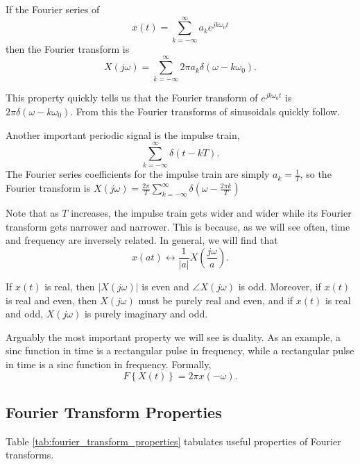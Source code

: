 If the Fourier series of
\begin{equation}
    x(t) = \sum_{k=-\infty}^{\infty} a_k e^{jk\omega_0 t}
\end{equation}
then the Fourier transform is
\begin{equation}
    X(j\omega) = \sum_{k=-\infty}^{\infty} 2\pi a_k \delta(\omega - k\omega_0).
\end{equation}

This property quickly tells us that the Fourier transform
of $e^{jk\omega_0 t}$ is $2\pi \delta(\omega-k\omega_0)$.
From this the Fourier transforms of sinusoidals quickly follow.

Another important periodic signal is the impulse train,
\begin{equation}
    \sum_{k=-\infty}^{\infty} \delta(t - kT).
\end{equation}
The Fourier series coefficients for
the impulse train are simply $a_k = \frac{1}{T}$,
so the Fourier transform is
$X(j\omega) = \frac{2\pi}{T} \sum_{k=-\infty}^{\infty} \delta(\omega - \frac{2\pi k}{T})$

Note that as $T$ increases, the impulse train gets wider
and wider while its Fourier transform gets narrower and
narrower. This is because, as we will see often, time and
frequency are inversely related. In general, we will find
that
\begin{equation}
    x(at) \leftrightarrow \frac{1}{|a|}X(\frac{j\omega}{a}).
\end{equation}

If $x(t)$ is real, then $|X(j\omega)|$ is even and
$\angle X(j\omega)$ is odd. Moreover, if $x(t)$ is real
and even, then $X(j\omega)$ must be purely real and even,
and if $x(t)$ is real and odd, $X(j\omega)$ is purely
imaginary and odd.

Arguably the most important property we will see is duality.
As an example, a sinc function in time is a rectangular pulse
in frequency, while a rectangular pulse in time is a sinc
function in frequency. Formally,
\begin{equation}
    F\left\{ X(t) \right\} = 2\pi x(-\omega).
\end{equation}

\subsection{Fourier Transform Properties}

Table \ref{tab:fourier_transform_properties} tabulates
useful properties of Fourier transforms.

